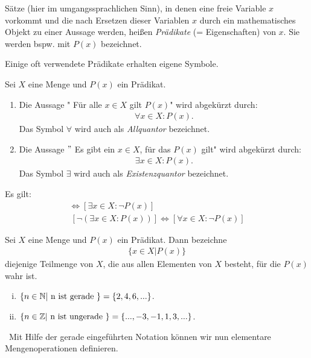 \begin{mydef}
    Sätze (hier im umgangssprachlichen Sinn), in denen eine freie Variable $x$ vorkommt und die nach Ersetzen dieser Variablen $x$ durch ein mathematisches Objekt zu einer Aussage werden, 
    heißen \textit{Prädikate} (= Eigenschaften) von $x$. Sie werden bspw. mit $P(x)$ bezeichnet.
\end{mydef}

Einige oft verwendete Prädikate erhalten eigene Symbole. 

\begin{mydef}
    Sei $X$ eine Menge und $P(x)$ ein Prädikat.
    \begin{enumerate}
        \item 
        Die Aussage " Für alle $x \in X$ gilt $P(x)$"  wird abgekürzt durch: 
        \begin{align*}
            \forall x \in X : P(x).
        \end{align*}
        Das Symbol $\forall$ wird auch als \textit{Allquantor} bezeichnet. 
        \item 
        Die Aussage $"$ Es gibt ein $x \in X$, für das $P(x)$ gilt"  wird abgekürzt durch: 
        \begin{align*}
            \exists x \in X : P(x).
        \end{align*}
        Das Symbol $\exists$ wird auch als \textit{Existenzquantor} bezeichnet. 
    \end{enumerate}
\end{mydef}

\begin{remark}
    Es gilt: 
    \begin{align*}
        [ \neg (\forall x \in X: P(x))] \iff [\exists x \in X: \neg P(x)] \\\
        [ \neg (\exists x \in X: P(x))] \iff [\forall x \in X: \neg P(x)]
    \end{align*}
\end{remark}

\begin{mydef}
    Sei $X$ eine Menge und $P(x)$ ein Prädikat. Dann bezeichne 
    \begin{align*}
        \{ x \in X | P(x) \}
    \end{align*}
    diejenige Teilmenge von $X$, die aus allen Elementen von $X$ besteht, für die $P(x)$ wahr ist. 
\end{mydef}

\begin{example}
    \begin{enumerate}[(i)]
        \item 
        $\{n \in \mathbb{N} | \text{ n ist gerade } \} = \{2,4,6,...\}$. 
        \item 
        $\{n \in \mathbb{Z} | \text{ n ist ungerade } \} = \{...,-3,-1,1,3,...\}$. 
        
    \end{enumerate}    
\end{example}\ 
Mit Hilfe der gerade eingeführten Notation können wir nun elementare Mengenoperationen definieren. 

